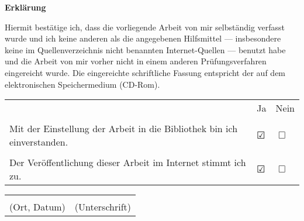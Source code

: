\thispagestyle{empty}
\clearpage
\vspace*{\fill}
	\begin{center}
		\begin{minipage}{1\textwidth}
			\huge
			\textbf{Erklärung}

			\vspace{0.1\textwidth}
			\normalsize
			Hiermit bestätige ich, dass die vorliegende Arbeit von mir selbständig verfasst wurde und ich keine anderen als die angegebenen Hilfsmittel --- insbesondere keine im Quellenverzeichnis nicht benannten Internet-Quellen --- benutzt habe und die Arbeit von mir vorher nicht in einem anderen Prüfungsverfahren eingereicht wurde. Die eingereichte schriftliche Fassung entspricht der auf dem elektronischen Speichermedium (CD-Rom).

			\vspace{0.1\textwidth}
			\begin{tabularx}{\textwidth}{X l l}
													& Ja            & Nein   \\
													&	        &        \\
				Mit der Einstellung der Arbeit in die Bibliothek bin ich einverstanden. & $\CheckedBox$ & $\Box$ \\
													&	        &	 \\
				Der Veröffentlichung dieser Arbeit im Internet stimmt ich zu.		& $\CheckedBox$ & $\Box$ \\
			\end{tabularx}

			\vspace{0.1\textwidth}
			\begin{tabularx}{\textwidth}{@{} X X @{}}
				\dotfill     & \dotfill       \\ 
				(Ort, Datum) & (Unterschrift)
			\end{tabularx}
		\end{minipage}
	\end{center}
\vfill
\clearpage
